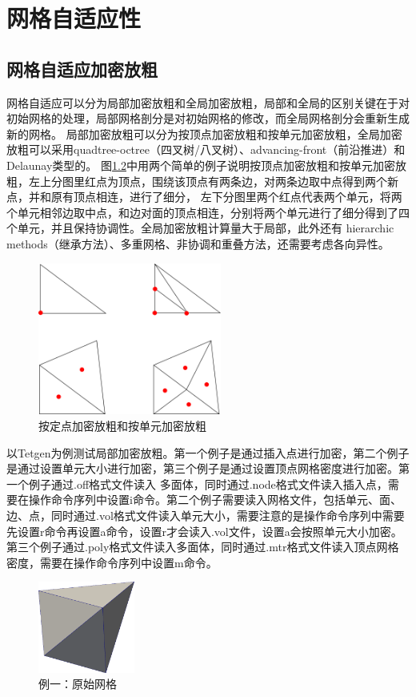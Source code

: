 \chapter{网格自适应性}

\section{网格自适应加密放粗}

网格自适应可以分为局部加密放粗和全局加密放粗，局部和全局的区别关键在于对初始网格的处理，局部网格剖分是对初始网格的修改，而全局网格剖分会重新生成新的网格。
局部加密放粗可以分为按顶点加密放粗和按单元加密放粗，全局加密放粗可以采用quadtree-octree（四叉树/八叉树）、advancing-front（前沿推进）和Delaunay类型的。
图\ref{fig:2-1}中用两个简单的例子说明按顶点加密放粗和按单元加密放粗，左上分图里红点为顶点，围绕该顶点有两条边，对两条边取中点得到两个新点，并和原有顶点相连，进行了细分，
左下分图里两个红点代表两个单元，将两个单元相邻边取中点，和边对面的顶点相连，分别将两个单元进行了细分得到了四个单元，并且保持协调性。全局加密放粗计算量大于局部，此外还有
hierarchic methods（继承方法）、多重网格、非协调和重叠方法，还需要考虑各向异性。

\begin{figure}[!htbp]
  \centering
  \includegraphics[height=5cm]{fig/2/1.png}
  \caption{按定点加密放粗和按单元加密放粗}
  \label{fig:2-1}
\end{figure}

以Tetgen为例测试局部加密放粗。第一个例子是通过插入点进行加密，第二个例子是通过设置单元大小进行加密，第三个例子是通过设置顶点网格密度进行加密。第一个例子通过.off格式文件读入
多面体，同时通过.node格式文件读入插入点，需要在操作命令序列中设置i命令。第二个例子需要读入网格文件，包括单元、面、边、点，同时通过.vol格式文件读入单元大小，需要注意的是操作命令序列中需要先设置r命令再设置a命令，设置r才会读入.vol文件，设置a会按照单元大小加密。第三个例子通过.poly格式文件读入多面体，同时通过.mtr格式文件读入顶点网格密度，需要在操作命令序列中设置m命令。

\begin{figure}[!htbp]
  \centering
  \includegraphics[height=3cm]{fig/2/2.png}
  \caption{例一：原始网格}
  \label{fig:2-1}
\end{figure}

